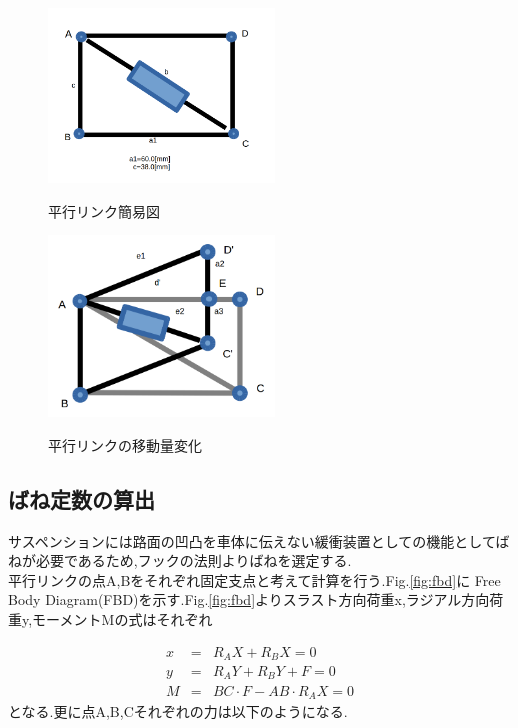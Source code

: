 \documentclass[a4paper]{jarticle}
\begin{document}
\begin{figure}[htbt]
 \begin{center}
  \includegraphics[width=60mm]{img/fig5.png}
 　\caption{平行リンク簡易図}
  \label{fig:bix}%
 \end{center}
\end{figure}


\begin{figure}[htbt]
 \begin{center}
  \includegraphics[width=60mm]{img/fig6.png}
 　\caption{平行リンクの移動量変化}
  \label{fig:rink}%
 \end{center}
\end{figure}

\subsection{ばね定数の算出}
サスペンションには路面の凹凸を車体に伝えない緩衝装置としての機能としてばねが必要であるため,フックの法則よりばねを選定する.　\\
平行リンクの点A,Bをそれぞれ固定支点と考えて計算を行う.Fig.\ref{fig:fbd}に Free Body Diagram(FBD)を示す.Fig.\ref{fig:fbd}よりスラスト方向荷重x,ラジアル方向荷重y,モーメントMの式はそれぞれ

\begin{eqnarray}
	x & = & R_AX+R_BX=0 \\
	y & = & R_AY+R_BY+F=0 \\
	M & = & BC\cdot F-AB\cdot R_AX=0
\end{eqnarray}
となる.更に点A,B,Cそれぞれの力は以下のようになる.
\end{document}
